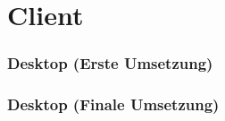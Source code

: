 \documentclass[aspectratio=43]{beamer}
\begin{document}
\section{Client}
\begin{frame}
	\frametitle{Desktop (Erste Umsetzung)}
\end{frame}

\begin{frame}
	\frametitle{Desktop (Finale Umsetzung)}
\end{frame}
\end{document}
